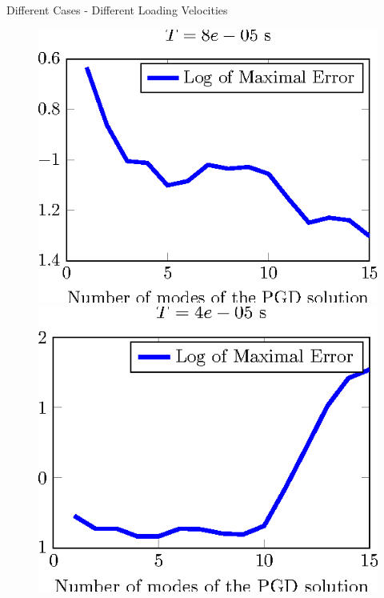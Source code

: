 \documentclass[10pt,a4paper]{beamer}
\begin{document}
\begin{frame}{Different Cases - Different Loading Velocities}
\begin{figure}
\begin{minipage}{0.24\linewidth}
			\includegraphics[width=1\linewidth]{Error.CalculSchem3.T2.tikz.eps}
		\end{minipage}
		\begin{minipage}{0.24\linewidth}
			\includegraphics[width=1\linewidth]{Error.CalculSchem3.T1.tikz.eps}
		\end{minipage}
	\end{figure}
\end{frame}
\end{document}
